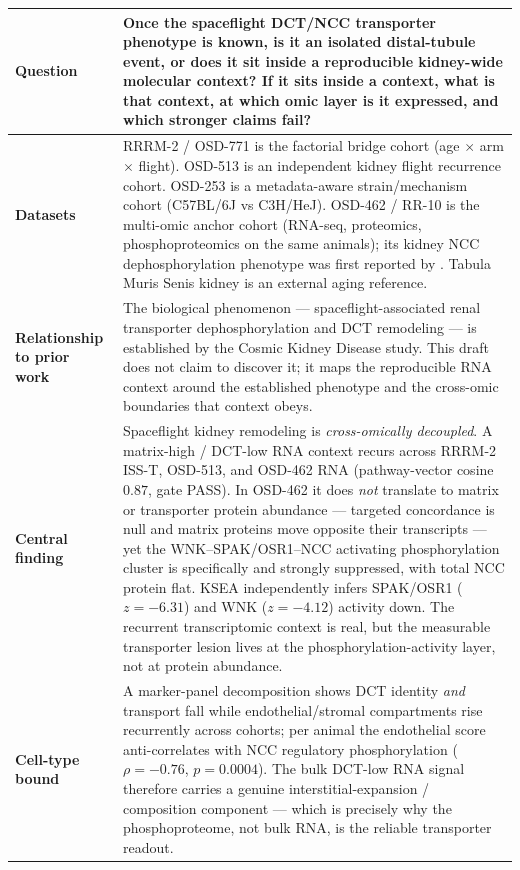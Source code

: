 \documentclass[11pt]{article}
\begin{document}
\vspace{0.6em}
\small
\begin{tabularx}{\textwidth}{>{\bfseries}p{}X}
\toprule
Question & Once the spaceflight DCT/NCC transporter phenotype is known, is it an isolated distal-tubule event, or does it sit inside a reproducible kidney-wide molecular context? If it sits inside a context, what is that context, at which omic layer is it expressed, and which stronger claims fail? \\
\midrule
Datasets & RRRM-2 / OSD-771 is the factorial bridge cohort (age $\times$ arm $\times$ flight). OSD-513 is an independent kidney flight recurrence cohort. OSD-253 is a metadata-aware strain/mechanism cohort (C57BL/6J vs C3H/HeJ). OSD-462 / RR-10 is the multi-omic anchor cohort (RNA-seq, proteomics, phosphoproteomics on the same animals); its kidney NCC dephosphorylation phenotype was first reported by \citet{siew2024cosmic}. Tabula Muris Senis kidney is an external aging reference. \\
\midrule
Relationship to prior work & The biological phenomenon --- spaceflight-associated renal transporter dephosphorylation and DCT remodeling --- is established by the Cosmic Kidney Disease study. This draft does not claim to discover it; it maps the reproducible RNA context around the established phenotype and the cross-omic boundaries that context obeys. \\
\midrule
Central finding & Spaceflight kidney remodeling is \emph{cross-omically decoupled}. A matrix-high / DCT-low RNA context recurs across RRRM-2 ISS-T, OSD-513, and OSD-462 RNA (pathway-vector cosine $0.87$, gate PASS). In OSD-462 it does \emph{not} translate to matrix or transporter protein abundance --- targeted concordance is null and matrix proteins move opposite their transcripts --- yet the WNK--SPAK/OSR1--NCC activating phosphorylation cluster is specifically and strongly suppressed, with total NCC protein flat. KSEA independently infers SPAK/OSR1 ($z=-6.31$) and WNK ($z=-4.12$) activity down. The recurrent transcriptomic context is real, but the measurable transporter lesion lives at the phosphorylation-activity layer, not at protein abundance. \\
\midrule
Cell-type bound & A marker-panel decomposition shows DCT identity \emph{and} transport fall while endothelial/stromal compartments rise recurrently across cohorts; per animal the endothelial score anti-correlates with NCC regulatory phosphorylation ($\rho=-0.76$, $p=0.0004$). The bulk DCT-low RNA signal therefore carries a genuine interstitial-expansion / composition component --- which is precisely why the phosphoproteome, not bulk RNA, is the reliable transporter readout. \\

\end{tabularx}
\end{document}
